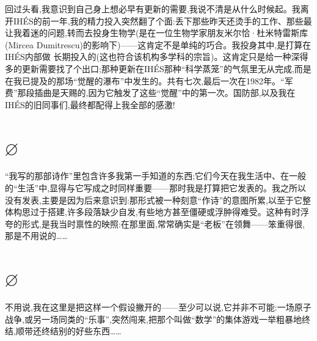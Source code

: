 回过头看,我意识到自己身上想必早有更新的需要,我说不清是从什么时候起。我离开IHÉS的前一年,我的精力投入突然翻了个面:丢下那些昨天还烫手的工作、那些最让我着迷的问题,转而去投身生物学(是在一位生物学家朋友米尔恰·杜米特雷斯库(Mircea Dumitrescu)的影响下)——这肯定不是单纯的巧合。我投身其中,是打算在IHÉS内部做
长期投入的(这也符合该机构多学科的宗旨)。这肯定只是给一种深得多的更新需要找了个出口;那种更新在IHÉS那种“科学蒸笼”的气氛里无从完成,而是在我已提及的那场“觉醒的瀑布”中发生的。共有七次,最后一次在1982年。“军费”那段插曲是天赐的,因为它触发了这些“觉醒”中的第一次。国防部,以及我在IHÉS的旧同事们,最终都配得上我全部的感激!

\section{$\varnothing$}

“我写的那部诗作”里包含许多我第一手知道的东西;它们今天在我生活中、在一般的“生活”中,显得与它写成之时同样重要——那时我是打算把它发表的。我之所以没有发表,主要是因为后来意识到:那形式被一种刻意“作诗”的意图所累,以至于它整体构思过于搭建,许多段落缺少自发,有些地方甚至僵硬或浮肿得难受。这种有时浮夸的形式,是我当时禀性的映照:在那里面,常常确实是“老板”在领舞——笨重得很,那是不用说的……

\section{$\varnothing$}

不用说,我在这里是把这样一个假设撇开的——至少可以说,它并非不可能:一场原子战争,或另一场同类的“乐事”,突然闯来,把那个叫做“数学”的集体游戏一举粗暴地终结,顺带还终结别的好些东西……
